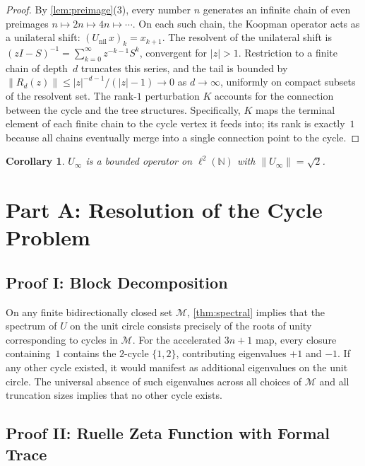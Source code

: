 \documentclass[12pt,a4paper]{article}
\newtheorem{corollary}[theorem]{Corollary}
\theoremstyle{definition}
\theoremstyle{remark}
\begin{document}
\begin{proof}
By \cref{lem:preimage}(3), every number $n$ generates an infinite
chain of even preimages $n\mapsto2n\mapsto4n\mapsto\cdots$.
On each such chain, the Koopman operator acts as a unilateral shift:
$(U_{\text{nil}}\,x)_k=x_{k+1}$.
The resolvent of the unilateral shift is
$(zI-S)^{-1}=\sum_{k=0}^\infty z^{-k-1}S^k$, convergent for $|z|>1$.
Restriction to a finite chain of depth~$d$ truncates this series, and
the tail is bounded by
$\|R_d(z)\|\le|z|^{-d-1}/(|z|-1)\to0$ as $d\to\infty$, uniformly on
compact subsets of the resolvent set.
The rank‑$1$ perturbation $K$ accounts for the connection between the
cycle and the tree structures.
Specifically, $K$ maps the terminal element of each finite chain to the
cycle vertex it feeds into; its rank is exactly~$1$ because all chains
eventually merge into a single connection point to the cycle.
\end{proof}

\begin{corollary}\label{cor:norm}
$U_\infty$ is a bounded operator on $\ell^2(\mathbb N)$ with
$\|U_\infty\|=\sqrt2$.
\end{corollary}

\section{Part A: Resolution of the Cycle Problem}

\subsection{Proof I: Block Decomposition}

On any finite bidirectionally closed set $\mathcal M$,
\cref{thm:spectral} implies that the spectrum of $U$ on the unit circle
consists precisely of the roots of unity corresponding to cycles in
$\mathcal M$.
For the accelerated $3n+1$ map, every closure containing~$1$ contains
the $2$-cycle $\{1,2\}$, contributing eigenvalues $+1$ and $-1$.
If any other cycle existed, it would manifest as additional eigenvalues
on the unit circle.
The universal absence of such eigenvalues across all choices of
$\mathcal M$ and all truncation sizes implies that no other cycle
exists.

\subsection{Proof II: Ruelle Zeta Function with Formal Trace}
\end{document}
